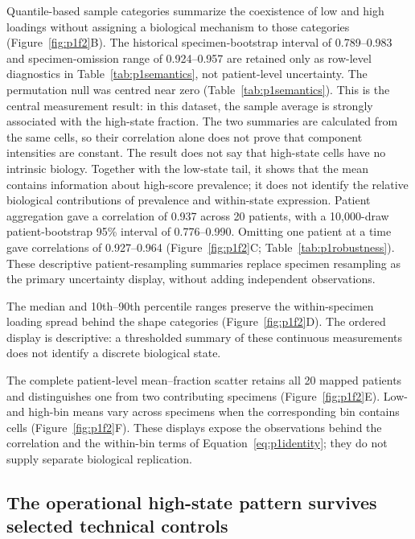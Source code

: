 

Quantile-based sample categories summarize the coexistence of low and high loadings without assigning a biological mechanism to those categories (Figure~\ref{fig:p1f2}B). The historical specimen-bootstrap interval of 0.789--0.983 and specimen-omission range of 0.924--0.957 are retained only as row-level diagnostics in Table~\ref{tab:p1semantics}, not patient-level uncertainty. The permutation null was centred near zero (Table~\ref{tab:p1semantics}). This is the central measurement result: in this dataset, the sample average is strongly associated with the high-state fraction. The two summaries are calculated from the same cells, so their correlation alone does not prove that component intensities are constant. The result does not say that high-state cells have no intrinsic biology. Together with the low-state tail, it shows that the mean contains information about high-score prevalence; it does not identify the relative biological contributions of prevalence and within-state expression. Patient aggregation gave a correlation of 0.937 across 20 patients, with a 10,000-draw patient-bootstrap 95\% interval of 0.776--0.990. Omitting one patient at a time gave correlations of 0.927--0.964 (Figure~\ref{fig:p1f2}C; Table~\ref{tab:p1robustness}). These descriptive patient-resampling summaries replace specimen resampling as the primary uncertainty display, without adding independent observations.

The median and 10th--90th percentile ranges preserve the within-specimen loading spread behind the shape categories (Figure~\ref{fig:p1f2}D). The ordered display is descriptive: a thresholded summary of these continuous measurements does not identify a discrete biological state.

The complete patient-level mean--fraction scatter retains all 20 mapped patients and distinguishes one from two contributing specimens (Figure~\ref{fig:p1f2}E). Low- and high-bin means vary across specimens when the corresponding bin contains cells (Figure~\ref{fig:p1f2}F). These displays expose the observations behind the correlation and the within-bin terms of Equation~\eqref{eq:p1identity}; they do not supply separate biological replication.

\subsection{The operational high-state pattern survives selected technical controls}

